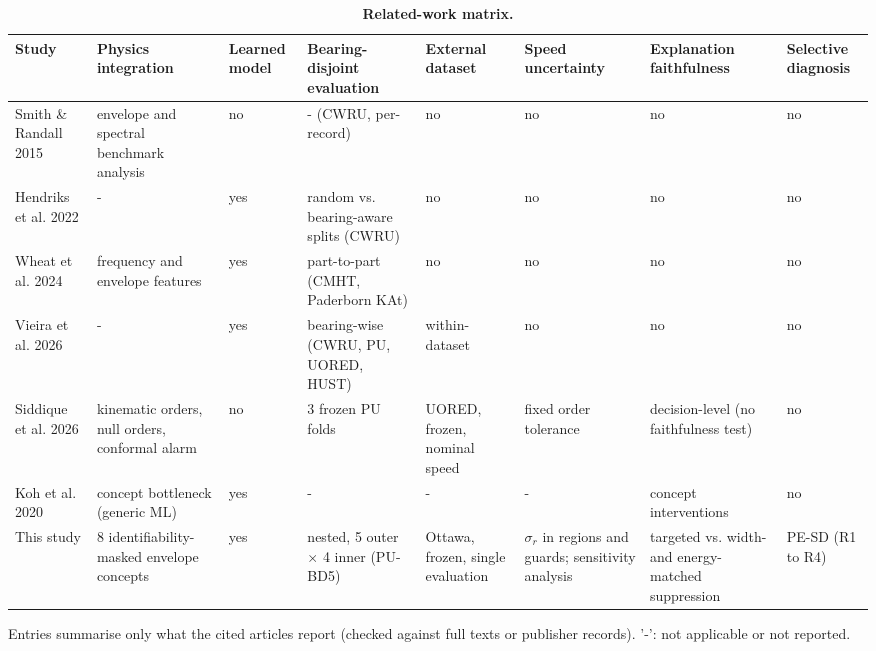 \begin{table}[!ht]
\centering
\caption{\textbf{Related-work matrix.}}
{\scriptsize
\begin{tabular}{|p{1.9cm}|p{1.9cm}|p{0.9cm}|p{1.9cm}|p{1.7cm}|p{1.5cm}|p{1.9cm}|p{1.1cm}|}
\hline
Study & Physics integration & Learned model & Bearing-disjoint evaluation & External dataset & Speed uncertainty & Explanation faithfulness & Selective diagnosis \\ \hline
Smith \& Randall 2015 \cite{smith2015rolling} & envelope and spectral benchmark analysis & no & - (CWRU, per-record) & no & no & no & no \\ \hline
Hendriks et al. 2022 \cite{hendriks2022towards} & - & yes & random vs. bearing-aware splits (CWRU) & no & no & no & no \\ \hline
Wheat et al. 2024 \cite{wheat2024impact} & frequency and envelope features & yes & part-to-part (CMHT, Paderborn KAt) & no & no & no & no \\ \hline
Vieira et al. 2026 \cite{vieira2026towards} & - & yes & bearing-wise (CWRU, PU, UORED, HUST) & within-dataset & no & no & no \\ \hline
Siddique et al. 2026 \cite{siddique2026physics} & kinematic orders, null orders, conformal alarm & no & 3 frozen PU folds & UORED, frozen, nominal speed & fixed order tolerance & decision-level (no faithfulness test) & no \\ \hline
Koh et al. 2020 \cite{koh2020concept} & concept bottleneck (generic ML) & yes & - & - & - & concept interventions & no \\ \hline
This study & 8 identifiability-masked envelope concepts & yes & nested, 5 outer $\times$ 4 inner (PU-BD5) & Ottawa, frozen, single evaluation & $\sigma_r$ in regions and guards; sensitivity analysis & targeted vs. width- and energy-matched suppression & PE-SD (R1 to R4) \\ \hline
\end{tabular}}
\begin{flushleft} Entries summarise only what the cited articles report (checked against full texts or publisher records). '-': not applicable or not reported. \end{flushleft}
\label{tab:related}
\end{table}